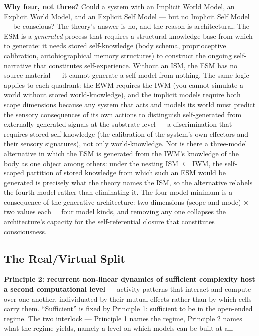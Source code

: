 \documentclass[12pt]{article}
\newcommand{\revend}{}
\begin{document}
{\textbf{Why four, not three?} Could a system with an Implicit World Model, an Explicit World Model, and an Explicit Self Model --- but no Implicit Self Model --- be conscious? The theory's answer is no, and the reason is architectural. The ESM is a \emph{generated} process that requires a structural knowledge base from which to generate: it needs stored self-knowledge (body schema, proprioceptive calibration, autobiographical memory structures) to construct the ongoing self-narrative that constitutes self-experience. Without an ISM, the ESM has no source material --- it cannot generate a self-model from nothing. The same logic applies to each quadrant: the EWM requires the IWM (you cannot simulate a world without stored world-knowledge), and the implicit models require both scope dimensions because any system that acts and models its world must predict the sensory consequences of its own actions to distinguish self-generated from externally generated signals at the substrate level — a discrimination that requires stored self-knowledge (the calibration of the system's own effectors and their sensory signatures), not only world-knowledge. Nor is there a three-model alternative in which the ESM is generated from the IWM's knowledge of the body as one object among others: under the nesting ISM $\subseteq$ IWM, the self-scoped partition of stored knowledge from which such an ESM would be generated is precisely what the theory names the ISM, so the alternative relabels the fourth model rather than eliminating it. The four-model minimum is a consequence of the generative architecture: two dimensions (scope and mode) $\times$ two values each = four model kinds, and removing any one collapses the architecture's capacity for the self-referential closure that constitutes consciousness.\revend}


\subsection{The Real/Virtual Split}

\textbf{Principle 2: recurrent non-linear dynamics of sufficient complexity host a second computational level} --- activity patterns that interact and compute over one another, individuated by their mutual effects rather than by which cells carry them. ``Sufficient'' is fixed by Principle 1: sufficient to be in the open-ended regime. The two interlock --- Principle 1 names the regime, Principle 2 names what the regime yields, namely a level on which models can be built at all.
\end{document}
